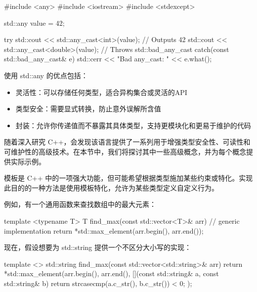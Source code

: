 \begin{cpp}
#include <any>
#include <iostream>
#include <stdexcept>

std::any value = 42;

try {
    std::cout << std::any_cast<int>(value); // Outputs 42
    std::cout << std::any_cast<double>(value); // Throws std::bad_any_cast
} catch(const std::bad_any_cast& e) {
    std::cerr << "Bad any_cast: " << e.what();
}
\end{cpp}

使用 std::any 的优点包括：

\begin{itemize}
\item
灵活性：可以存储任何类型，适合异构集合或灵活的API

\item
类型安全：需要显式转换，防止意外误解所含值

\item
封装：允许你传递值而不暴露其具体类型，支持更模块化和更易于维护的代码
\end{itemize}


随着深入研究 C++，会发现该语言提供了一系列用于增强类型安全性、可读性和可维护性的高级技术。在本节中，我们将探讨其中一些高级概念，并为每个概念提供实际示例。


模板是 C++ 中的一项强大功能，但可能希望根据类型施加某些约束或特化。实现此目的的一种方法是使用模板特化，允许为某些类型定义自定义行为。

例如，有一个通用函数来查找数组中的最大元素：

\begin{cpp}
template <typename T>
T find_max(const std::vector<T>& arr) {
    // generic implementation
    return *std::max_element(arr.begin(), arr.end());
}
\end{cpp}

现在，假设想要为 std::string 提供一个不区分大小写的实现：

\begin{cpp}
template <>
std::string find_max(const std::vector<std::string>& arr) {
    return *std::max_element(arr.begin(), arr.end(),
                                [](const std::string& a, const std::string& b) {
                                    return strcasecmp(a.c_str(), b.c_str()) < 0;
                                    });
                                }
\end{cpp}

